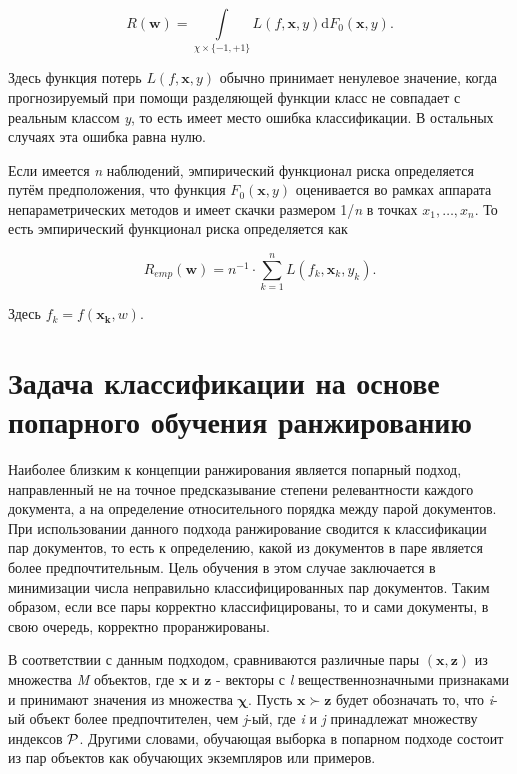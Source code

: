 \documentclass[12pt,a4paper,oneside]{article}
\begin{document}
\[
R(\mathbf{w}) = \int \limits_{\chi \times \{-1, +1\}} L(f, \mathbf{x}, y) \mathrm{d} F_0(\mathbf{x}, y).
\]

Здесь функция потерь \(L(f, \mathbf{x}, y)\) обычно принимает ненулевое значение, когда прогнозируемый при помощи разделяющей функции класс не совпадает с реальным классом \emph{y}, то есть имеет место ошибка классификации. 
В остальных случаях эта ошибка равна нулю. 

\par
Если имеется \emph{n} наблюдений, эмпирический функционал риска определяется путём предположения, что функция \(F_0(\mathbf{x}, y)\) оценивается во рамках аппарата непараметрических методов  и имеет скачки размером 1/\emph{n} в точках \(x_1, \dots, x_n\). 
То есть эмпирический функционал риска определяется как

\[
R_{emp}(\mathbf{w}) = n^{-1} \cdot \sum \limits_{k=1}^n L(f_k, \mathbf{x}_k, y_k).
\]

Здесь \(f_k=f(\mathbf{x_k}, w)\). 


\section{Задача классификации на основе попарного обучения ранжированию}
\label{sec:pairwise_rank_learning_problem}

\par
Наиболее близким к концепции ранжирования является попарный подход, направленный не на точное предсказывание степени релевантности каждого документа, а на определение относительного порядка между парой документов. 
При использовании данного подхода ранжирование сводится к классификации пар документов, то есть к определению, какой из документов в паре является более предпочтительным.
Цель обучения в этом случае заключается в минимизации числа неправильно классифицированных пар документов. 
Таким образом, если все пары корректно классифицированы, то и сами документы, в свою очередь, корректно проранжированы. 

\par
В соответствии с данным подходом, сравниваются различные пары \((\mathbf{x},\mathbf{z})\) из множества \emph{M} объектов, где \(\mathbf{x}\) и \(\mathbf{z}\) - векторы с \emph{l} вещественнозначными признаками и принимают значения из множества \(\mathbf{\chi}\). 
Пусть \(\mathbf{x} \succ \mathbf{z}\) будет обозначать то, что \emph{i}-ый объект более предпочтителен, чем \emph{j}-ый, где \emph{i} и \emph{j} принадлежат множеству индексов \(\mathcal{P}\). 
Другими словами, обучающая выборка в попарном подходе состоит из пар объектов как обучающих экземпляров или примеров. 
\end{document}
